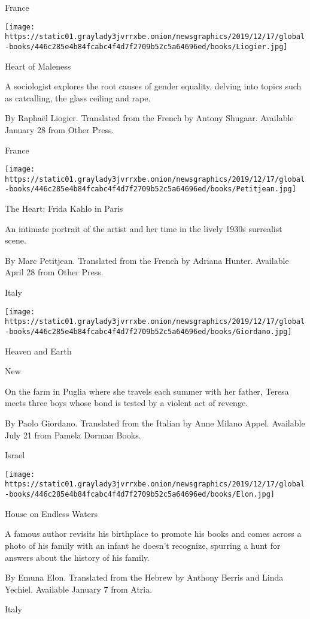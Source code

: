 France

\texttt{[image: https://static01.graylady3jvrrxbe.onion/newsgraphics/2019/12/17/global-books/446c285e4b84fcabc4f4d7f2709b52c5a64696ed/books/Liogier.jpg]}

Heart of Maleness

A sociologist explores the root causes of gender equality, delving into
topics such as catcalling, the glass ceiling and rape.

 By Raphaël Liogier. Translated from the French by Antony Shugaar.
Available January 28 from Other Press.

France

\texttt{[image: https://static01.graylady3jvrrxbe.onion/newsgraphics/2019/12/17/global-books/446c285e4b84fcabc4f4d7f2709b52c5a64696ed/books/Petitjean.jpg]}

The Heart: Frida Kahlo in Paris

An intimate portrait of the artist and her time in the lively 1930s
surrealist scene.

 By Marc Petitjean. Translated from the French by Adriana Hunter.
Available April 28 from Other Press.

Italy

\texttt{[image: https://static01.graylady3jvrrxbe.onion/newsgraphics/2019/12/17/global-books/446c285e4b84fcabc4f4d7f2709b52c5a64696ed/books/Giordano.jpg]}

Heaven and Earth

New

On the farm in Puglia where she travels each summer with her father,
Teresa meets three boys whose bond is tested by a violent act of
revenge.

 By Paolo Giordano. Translated from the Italian by Anne Milano Appel.
Available July 21 from Pamela Dorman Books.

Israel

\texttt{[image: https://static01.graylady3jvrrxbe.onion/newsgraphics/2019/12/17/global-books/446c285e4b84fcabc4f4d7f2709b52c5a64696ed/books/Elon.jpg]}

House on Endless Waters

A famous author revisits his birthplace to promote his books and comes
across a photo of his family with an infant he doesn't recognize,
spurring a hunt for answers about the history of his family.

 By Emuna Elon. Translated from the Hebrew by Anthony Berris and Linda
Yechiel. Available January 7 from Atria.

Italy


